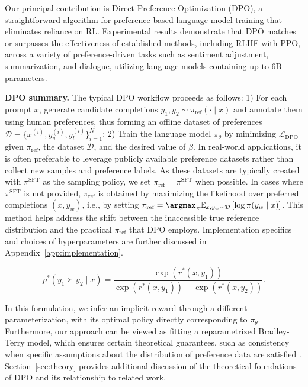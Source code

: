 Our principal contribution is Direct Preference Optimization (DPO), a straightforward algorithm for preference-based language model training that eliminates reliance on RL. Experimental results demonstrate that DPO matches or surpasses the effectiveness of established methods, including RLHF with PPO, across a variety of preference-driven tasks such as sentiment adjustment, summarization, and dialogue, utilizing language models containing up to 6B parameters.

\textbf{DPO summary.} The typical DPO workflow proceeds as follows: 1) For each prompt $x$, generate candidate completions $y_1, y_2 \sim \pi_\text{ref}(\cdot \mid x)$ and annotate them using human preferences, thus forming an offline dataset of preferences $\mathcal{D} = \{x^{(i)}, y_w^{(i)}, y_l^{(i)}\}_{i=1}^N$; 2) Train the language model $\pi_\theta$ by minimizing $\mathcal{L}_\text{DPO}$ given $\pi_\text{ref}$, the dataset $\mathcal{D}$, and the desired value of $\beta$.  
In real-world applications, it is often preferable to leverage publicly available preference datasets rather than collect new samples and preference labels. As these datasets are typically created with $\pi^\text{SFT}$ as the sampling policy, we set $\pi_\text{ref} = \pi^\text{SFT}$ when possible. In cases where $\pi^\text{SFT}$ is not provided, $\pi_\text{ref}$ is obtained by maximizing the likelihood over preferred completions ${(x, y_w)}$, i.e., by setting ${\pi_\text{ref} = \argmax_{\pi}\mathbb{E}_{x, y_w \sim \mathcal{D}}\left[\log \pi(y_w \mid x)\right]}$. This method helps address the shift between the inaccessible true reference distribution and the practical $\pi_\text{ref}$ that DPO employs. Implementation specifics and choices of hyperparameters are further discussed in Appendix~\ref{app:implementation}.

\label{sec:theory}

\begin{equation}\label{eq:bradley-terry}
    p^*(y_1\succ y_2 \mid x)=\frac{\exp\left(r^*(x, y_1)\right)}{\exp\left(r^*(x, y_1)\right) + \exp\left(r^*(x, y_2)\right)}.
\end{equation}

In this formulation, we infer an implicit reward through a different parameterization, with its optimal policy directly corresponding to $\pi_\theta$. Furthermore, our approach can be viewed as fitting a reparametrized Bradley-Terry model, which ensures certain theoretical guarantees, such as consistency when specific assumptions about the distribution of preference data are satisfied \cite{bong2022generalized}. Section~\ref{sec:theory} provides additional discussion of the theoretical foundations of DPO and its relationship to related work.

